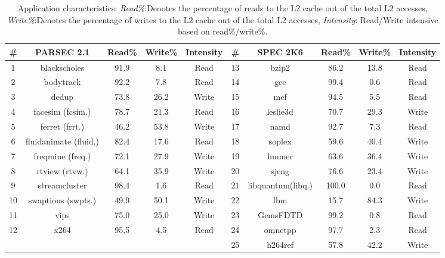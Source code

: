 \begin {table}[t]
 \centering
  \singlespacing
 \caption{{Application characteristics}: {\it Read\%}:Denotes the percentage of reads to the L2 cache out of the total L2 accesses,
 {\it Write\%}:Denotes the percentage of writes to the L2 cache out of the total L2 accesses, {\it Intensity}: Read/Write intensive based on read\%/write\%.}
 \vspace{0.2in}
 \label{table:benchmark}
 \scriptsize
\begin{tabular}{||c|c|c|c|c||c|c|c|c|c||}
\hline
\# & PARSEC 2.1 & Read\% & Write\% & Intensity & \# & SPEC 2K6 & Read\% & Write\% & Intensity \\
\hline \hline
1 & blackscholes  &  91.9 &  8.1 &   Read &  13 &  bzip2 & 86.2 & 13.8 & Read \\
\hline
2 &     bodytrack  &     92.2 &  7.8 &   Read &  14 & gcc &  99.4 &  0.6 & Read \\
\hline
3 &     dedup  & 73.8 &  26.2 &  Write & 15 &    mcf & 94.5 &  5.5 & Read \\
\hline
4 &     facesim (fcsim.) & 78.7 &  21.3 &  Read &  16 & leslie3d & 70.7 & 29.3 & Write \\
\hline
5 &     ferret (frrt.) & 46.2 &  53.8 &  Write & 17 & namd &  92.7 &  7.3 & Read \\
\hline
6 &     fluidanimate (fluid.) &  82.4 &  17.6 &  Read &  18 & soplex & 59.6 & 40.4 & Write \\
\hline
7 &     freqmine (freq.) & 72.1 & 27.9 & Write & 19 & hmmer &   63.6 &  36.4 &  Write \\
\hline
8 &     rtview (rtvw.) & 64.1 & 35.9 &  Write & 20 & sjeng & 76.6 &  23.4 &  Write \\
\hline
9 &     streamcluster & 98.4 &  1.6 &   Read &  21 & libquantum(libq.) & 100.0 & 0.0 & Read \\
\hline
10 &    swaptions (swpts.) & 49.9 & 50.1 & Write & 22 & lbm & 15.7 & 84.3 & Write \\
\hline
11 &    vips &  75.0 &  25.0 &  Write &  23 & GemsFDTD & 99.2 & 0.8 & Read \\
\hline
12 &    x264 &  95.5 &  4.5 & Read &  24 & omnetpp & 97.7 & 2.3 & Read \\
\hline
& & & & & 25 &  h264ref & 57.8 &  42.2 &  Write \\
\hline 
\end{tabular}
\end{table}



